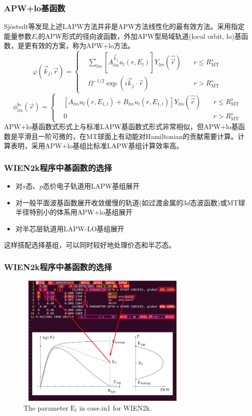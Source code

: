 \frame
{
\frametitle{\textrm{APW+lo}基函数}
\textrm{Sj\"ostedt}等发现上述\textrm{LAPW}方法并非是\textrm{APW}方法线性化的最有效方法。采用指定能量参数$E_l$的\textrm{APW}形式的径向波函数，外加\textrm{APW}型局域轨道(\textrm{local orbit, lo})基函数，是更有效的方案，称为\textrm{APW+lo}方法。
$$  \varphi(\vec k_j,\vec r)=\left\{
  \begin{aligned}
    &\sum_{lm}[A^{\vec k_j}_{lm}u_l(r,E_l)]Y_{lm}(\hat{\vec r})\quad&r\leqslant R_{\mathrm{MT}}^s\\
    &\Omega^{-1/2}\exp(i\vec k_j\cdot\vec r) &r>R_{\mathrm{MT}}^s
  \end{aligned}\right.
  \label{eq:APW-basis}
$$
$$  \phi_{lm}^{\mathrm{lo}}(\vec r)=\left\{
  \begin{aligned}
  &[A_{lm}u_l(r,E_{1,l})+B_{lm}\dot u_l(r,E_{1,l})]Y_{lm}(\hat{\vec r})\quad&r\leqslant R_{\mathrm{MT}}^s\\
  &0&r>R_{\mathrm{MT}}^s
  \end{aligned}
\right.$$
\textrm{APW+lo}基函数式形式上与标准\textrm{LAPW}基函数式形式非常相似，但\textrm{APW+lo}基函数是平滑且一阶可微的，在\textrm{MT}球面上有动能对\textrm{Hamiltonian}的贡献需要计算。计算表明，采用\textrm{APW+lo}基组比标准\textrm{LAPW}基组计算效率高。
}

\frame
{
\frametitle{\textrm{WIEN2k}程序中基函数的选择}
\vskip 10pt
\begin{itemize}
\setlength{\itemsep}{15pt}
	\item 对$s$态、$p$态价电子轨道用\textrm{LAPW}基组展开
	\item 对一般平面波基函数展开收敛缓慢的轨道(如过渡金属的3$d$态波函数)或\textrm{MT}球半径特别小的体系用\textrm{APW+lo}基组展开
	\item 对半芯层轨道用\textrm{LAPW-LO}基组展开
\end{itemize}
这样搭配选择基组，可以同时较好地处理价态和半芯态。
}

\frame
{
\frametitle{\textrm{WIEN2k}程序中基函数的选择}
\begin{figure}[h!]
	\vspace{-15pt}
\centering
\hspace{15pt}
\includegraphics[height=2.55in,width=3.35in,viewport=10 30 750 605,clip]{Figures/WIEN2k-in1.png}
\caption{\small \textrm{The parameter $\mathrm{E}_l$ in case.in1 for WIEN2k.}}%
\label{WIEN2k-in1}
\end{figure}
}


